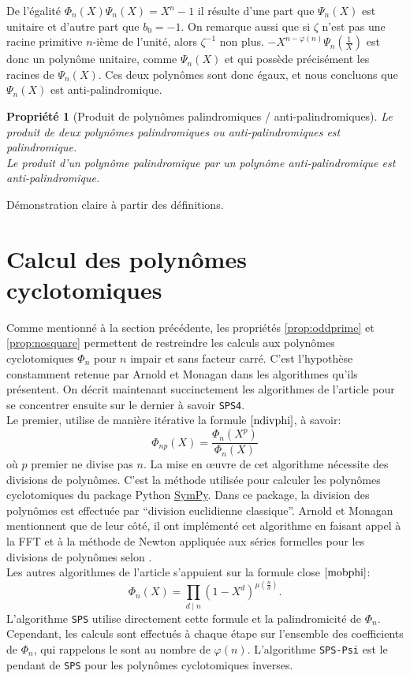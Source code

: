 \documentclass{article}
\theoremstyle{break}                  %
\newtheorem{propriete}{Propriété}
\begin{document}
De l'égalité $\Phi_n(X)\Psi_n(X) = X^n-1$ il résulte d'une part que $\Psi_n(X)$ est unitaire et d'autre part que $b_0=-1$. On remarque aussi que si $\zeta$ n'est pas une racine primitive $n$-ième de l'unité, alors $\zeta^{-1}$ non plus. $-X^{n-\varphi(n)} \Psi_n(\frac{1}{X})$ est donc un polynôme unitaire, comme $\Psi_{n}(X)$ et qui possède précisément les racines de $\Psi_{n}(X)$. Ces deux polynômes sont donc égaux, et nous concluons que $\Psi_{n}(X)$ est anti-palindromique.


\begin{propriete}[Produit de polynômes palindromiques / anti-palindromiques]
	Le produit de deux polynômes palindromiques ou anti-palindromiques est palindromique.\\
	Le produit d'un polynôme palindromique par un polynôme anti-palindromique est anti-palindromique.
\end{propriete}
Démonstration claire à partir des définitions. 

\section*{Calcul des polynômes cyclotomiques}
Comme mentionné à la section précédente, les propriétés \ref{prop:oddprime} et \ref{prop:nosquare} permettent de restreindre les calculs aux polynômes cyclotomiques $\Phi_n$ pour $n$ impair et sans facteur carré. C'est l'hypothèse constamment retenue par Arnold et Monagan dans les algorithmes qu'ils présentent. On décrit maintenant succinctement les algorithmes de l'article pour se concentrer ensuite sur le dernier à savoir \texttt{SPS4}.\\

Le premier, utilise de manière itérative la formule $\ref{ndivphi}$, à savoir:
$$\Phi_{np}(X) = \frac{\Phi_n(X^p)}{\Phi_n(X)}$$ où $p$ premier ne divise pas $n$. La mise en œuvre de cet algorithme nécessite des divisions de polynômes. C'est la méthode utilisée pour calculer les polynômes cyclotomiques du package Python \href{https://docs.sympy.org/latest/index.html}{SymPy}. Dans ce package, la division des polynômes est effectuée par \enquote{division euclidienne classique}. Arnold et Monagan mentionnent que de leur côté, il ont implémenté cet algorithme en faisant appel à la FFT et à la méthode de Newton appliquée aux séries formelles pour les divisions de polynômes selon \cite{algocomputalg}.\\

Les autres algorithmes de l'article s'appuient sur la formule close $\ref{mobphi}$:
$$\Phi_n(X) =  \prod_{d \mid n} (1 - X^d)^{\mu(\frac{n}{d})}.$$
L'algorithme \texttt{SPS} utilise directement cette formule et la palindromicité de $\Phi_n$. Cependant, les calculs sont effectués à chaque étape sur l'ensemble des coefficients de $\Phi_n$, qui rappelons le sont au nombre de $\varphi(n)$. L'algorithme \texttt{SPS-Psi} est le pendant de \texttt{SPS} pour les polynômes cyclotomiques inverses.\\
\end{document}
